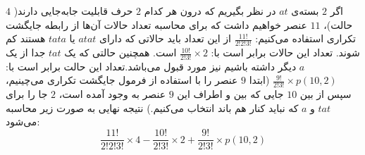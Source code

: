 اگر 
$2$ 
بسته‌ی
$at$
 در نظر بگیریم که درون هر کدام
$2$ 
  حرف قابلیت جابه‌جایی دارند(
$4$ 
  حالت)، 
$11$ 
  عنصر خواهیم داشت که برای محاسبه تعداد حالات آن‌ها از رابطه جایگشت تکراری استفاده می‌کنیم:
	\p 
\(\frac{11!}{2!2!3!}\) 
	\p
  از این تعداد باید حالاتی که دارای
$atat$
   یا 
$tata$
   هستند کم شوند. تعداد این حالات برابر است با:
	\p
\(\frac{10!}{2!3!}\times2\)
    است. همچنین حالتی که یک
$tat$
     جدا از یک 
$a$
      دیگر داشته باشیم نیز مورد قبول می‌باشد.تعداد این حالت برابر است با: 
\({\frac{9!}{2!3!}}\times{p(10,2)}\)
	\p
       (ابتدا 
$9$ 
       عنصر را با استفاده از فرمول جایگشت تکراری می‌چینیم، سپس از بین 
$10$ 
      جایی که بین و اطراف این 
$9$ 
      عنصر به وجود آمده است،
$2$ 
      جا را برای
$tat$
      و
$a$ 
      که نباید کنار هم باند انتخاب می‌کنیم.)
	\p
       نتیجه نهایی به صورت زیر محاسبه می‌شود:
    \[\frac{11!}{2!2!3!}\times4 - \frac{10!}{2!3!}\times2 + {\frac{9!}{2!3!}}\times{p(10,2)}\]